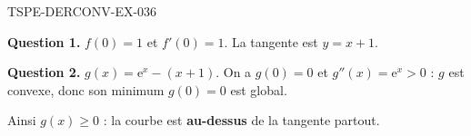\begin{corrige}{TSPE-DERCONV-EX-036}

\textbf{Question 1.} $f(0) = 1$ et $f'(0) = 1$. La tangente est $y = x + 1$.


\textbf{Question 2.} $g(x) = \mathrm{e}^x - (x+1)$. On a $g(0)=0$ et $g''(x) = \mathrm{e}^x > 0$ : $g$ est convexe, donc son minimum $g(0)=0$ est global.

Ainsi $g(x) \geq 0$ : la courbe est \textbf{au-dessus} de la tangente partout.

\end{corrige}
